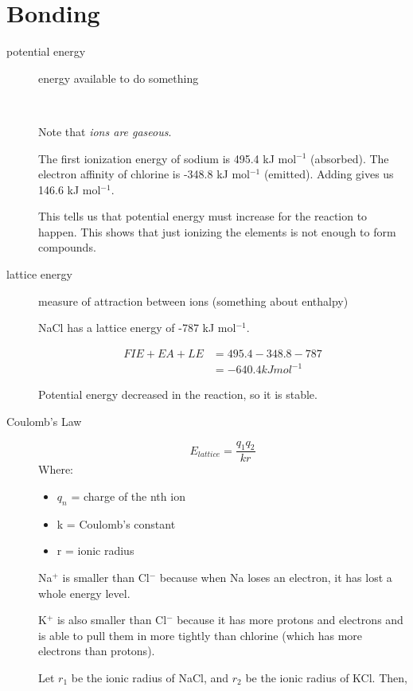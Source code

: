 \documentclass[a4paper, 8pt]{memoir}
\begin{document}
\chapter{Bonding}
\begin{description}
\item[potential energy] energy available to do something

 \\

Note that \emph{ions are gaseous}.

The first ionization energy of sodium is 495.4 kJ mol$^{-1}$ (absorbed). The electron affinity of chlorine is -348.8 kJ mol$^{-1}$ (emitted). Adding gives us 146.6 kJ mol$^{-1}$.

This tells us that potential energy must increase for the reaction to happen. This shows that just ionizing the elements is not enough to form compounds.

\item[lattice energy] measure of attraction between ions (something about enthalpy)

NaCl has a lattice energy of -787 kJ mol$^{-1}$.

\begin{align*}
FIE + EA + LE &= 495.4 - 348.8 - 787 \\
&= -640.4 kJ mol^{-1}
\end{align*}

Potential energy decreased in the reaction, so it is stable.

\item[Coulomb's Law] \begin{equation}
E_{lattice} = \frac{q_1 q_2}{k r}
\end{equation}
Where:
\begin{itemize}
\item $q_n$ = charge of the nth ion
\item k = Coulomb's constant
\item r = ionic radius
\end{itemize}

Na$^+$ is smaller than Cl$^-$ because when Na loses an electron, it has lost a whole energy level.

K$^+$ is also smaller than Cl$^-$ because it has more protons and electrons and is able to pull them in more tightly than chlorine (which has more electrons than protons).

Let $r_1$ be the ionic radius of NaCl, and $r_2$ be the ionic radius of KCl. Then,


\end{description}
\end{document}
